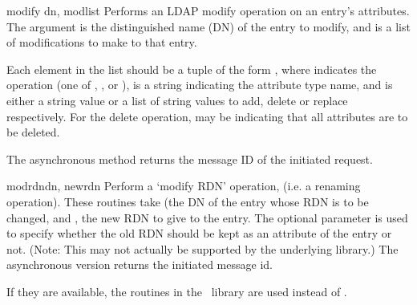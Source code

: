
\begin{methoddesc}[LDAP]{modify}{ dn, modlist } %
Performs an LDAP modify operation on an entry's attributes. 
The  argument is the distinguished name (DN) of the entry to modify,
and  is a list of modifications to make to that entry.

Each element in the list  should be a tuple of the form 
,
where  indicates the operation (one of , 
, or ),
 is a string indicating the attribute type name, and 
 is either a string value or a list of string values to add, 
delete or replace respectively.  For the delete operation, 
may be  indicating that all attributes are to be deleted.

The asynchronous method  returns the message ID of the 
initiated request.

\end{methoddesc}


\begin{methoddesc}[LDAP]{modrdn}{dn, newrdn }
Perform a `modify RDN' operation, (i.e. a renaming operation).
These routines take  (the DN
of the entry whose RDN is to be changed, and , the new RDN to
give to the entry. The optional parameter  is used to specify
whether the old RDN should be kept as an attribute of the entry or not.
(Note: This may not actually be supported by the underlying library.)
The asynchronous version returns the initiated message id.

If they are available, the  routines in the \C\ library
are used instead of .
\end{methoddesc}


